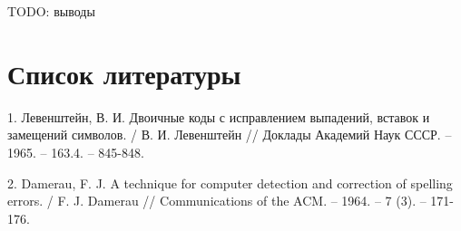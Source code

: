 \documentclass{report}
\begin{document}
TODO: выводы

\chapter*{Список литературы}

1. Левенштейн, В. И. Двоичные коды с исправлением выпадений,
вставок и замещений символов. / В. И. Левенштейн // Доклады
Академий Наук СССР. -- 1965. -- 163.4. -- 845-848.

2. Damerau, F. J. A technique for computer detection and correction
of spelling errors. / F. J. Damerau // Communications of the ACM.
-- 1964. -- 7 (3). -- 171-176.
\end{document}
